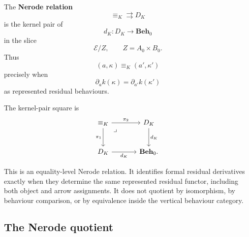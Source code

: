\begin{definition}
\label{def:nerode-relation}
    The \textbf{Nerode relation}
    \[
        {\equiv_K}\rightrightarrows D_K
    \]
    is the kernel pair of
    \[
        d_K:D_K\to\mathbf{Beh}_0
    \]
    in the slice
    \[
        \mathcal E/Z,
        \qquad
        Z=A_0\times B_0.
    \]
    Thus
    \[
        (a,\kappa)\equiv_K(a',\kappa')
    \]
    precisely when
    \[
        \partial_a k(\kappa)=\partial_{a'}k(\kappa')
    \]
    as represented residual behaviours.
\end{definition}

The kernel-pair square is
\[
    \begin{tikzcd}[column sep=large, row sep=large]
            {\equiv_K}
                \arrow[r, "\pi_2"]
                \arrow[d, "\pi_1"']
                \arrow[dr, phantom, "\lrcorner", very near start]
        &
            D_K
                \arrow[d, "d_K"]
        \\
            D_K
                \arrow[r, "d_K"']
        &
            \mathbf{Beh}_0.
    \end{tikzcd}
\]

\begin{remark}
\label{rem:equality-level-nerode}
    This is an equality-level Nerode relation. It identifies formal residual derivatives exactly when they determine the same represented residual functor, including both object and arrow assignments. It does not quotient by isomorphism, by behaviour comparison, or by equivalence inside the vertical behaviour category.
\end{remark}

\subsection{The Nerode quotient}
\label{subsec:nerode-quotient}

